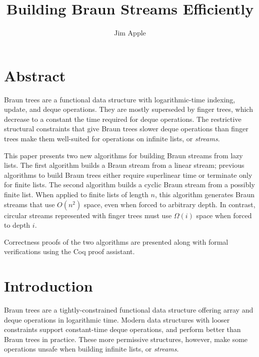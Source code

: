 \documentclass[envcountsect]{llncs}
\begin{document}
\title{Building Braun Streams Efficiently}

\author{Jim Apple}

\institute{}

\maketitle

\section*{Abstract}

Braun trees are a functional data structure with logarithmic-time indexing, update, and deque operations.\cite{hoogerwoord}
They are mostly superseded by finger trees, which decrease to a constant the time required for deque operations.\cite{kaplan96purely,HinzePat}
The restrictive structural constraints that give Braun trees slower deque operations than finger trees make them well-suited for operations on infinite lists, or {\em streams}.

This paper presents two new algorithms for building Braun streams from lazy lists.
The first algorithm builds a Braun stream from a linear stream; previous algorithms to build Braun trees either require superlinear time or terminate only for finite lists.\cite{okasakiBraun} 
The second algorithm builds a cyclic Braun stream from a possibly finite list. 
When applied to finite lists of length $n$, this algorithm generates Braun streams that use $O(n^2)$ space, even when forced to arbitrary depth.
In contrast, circular streams represented with finger trees must use $\Omega(i)$ space when forced to depth $i$.

Correctness proofs of the two algorithms are presented along with formal verifications using the Coq proof assistant.

\section{Introduction}
\label{logspaceCycle}

Braun trees are a tightly-constrained functional data structure offering array and deque operations in logarithmic time.\cite{hoogerwoord,okasakiBraun} 
Modern data structures with looser constraints support constant-time deque operations, and perform better than Braun trees in practice.\cite{HinzePat,okasakiSkewLists}
These more permissive structures, however, make some operations unsafe when building infinite lists, or {\em streams}.
\end{document}
